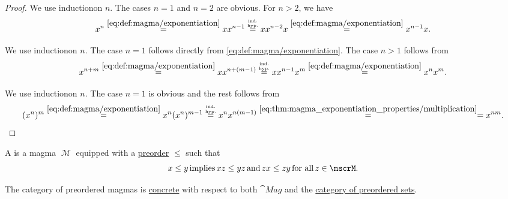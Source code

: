 \begin{proof}
   We use induction\IND on \( n \). The cases \( n = 1 \) and \( n = 2 \) are obvious. For \( n > 2 \), we have
  \begin{equation*}
    x^n
    \overset {\eqref{eq:def:magma/exponentiation}} =
    x x^{n-1}
    \overset {\substack{\text{\tiny ind.} \\ \text{\tiny hyp.}}} =
    x x^{n-2} x
    \overset {\eqref{eq:def:magma/exponentiation}} =
    x^{n-1} x.
  \end{equation*}

   We use induction\LEM on \( n \). The case \( n = 1 \) follows directly from \eqref{eq:def:magma/exponentiation}. The case \( n > 1 \) follows from
  \begin{equation*}
    x^{n + m}
    \overset {\eqref{eq:def:magma/exponentiation}} =
    x x^{n + (m - 1)}
    \overset {\substack{\text{\tiny ind.} \\ \text{\tiny hyp.}}} =
    x x^{n-1} x^m
    \overset {\eqref{eq:def:magma/exponentiation}} =
    x^n x^m.
  \end{equation*}

   We use induction\LEM on \( n \). The case \( n = 1 \) is obvious and the rest follows from
  \begin{equation*}
    (x^n)^m
    \overset {\eqref{eq:def:magma/exponentiation}} =
    x^n (x^n)^{m-1}
    \overset {\substack{\text{\tiny ind.} \\ \text{\tiny hyp.}}} =
    x^n x^{n (m - 1)}
    \overset {\eqref{eq:thm:magma_exponentiation_properties/multiplication}} =
    =
    x^{nm}.
  \end{equation*}
\end{proof}

\begin{definition}\label{def:preordered_magma}
  A  is a magma \( \mscrM \) equipped with a \hyperref[def:preordered_set]{preorder} \( \leq \) such that
  \begin{equation}\label{eq:def:preordered_magma/compatibility}
    x \leq y \T{implies} xz \leq yz \T{and} zx \leq zy \T{for all} z \in \mscrM.
  \end{equation}

  The category of preordered magmas is \hyperref[def:concrete_category]{concrete} with respect to both \( \cat{Mag} \) and the \hyperref[def:preordered_magma]{category of preordered sets}.
\end{definition}

